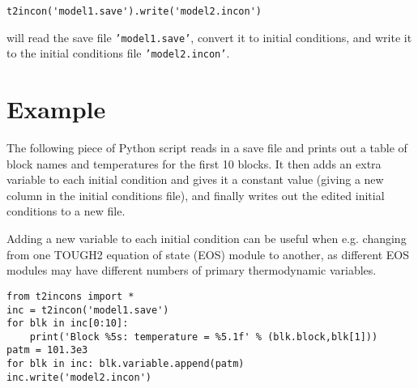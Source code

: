 \begin{lstlisting}
t2incon('model1.save').write('model2.incon')
\end{lstlisting}

will read the save file \texttt{'model1.save'}, convert it to initial conditions, and write it to the initial conditions file \texttt{'model2.incon'}.

\section{Example}

The following piece of Python script reads in a save file and prints out a table of block names and temperatures for the first 10 blocks.  It then adds an extra variable to each initial condition and gives it a constant value (giving a new column in the initial conditions file), and finally writes out the edited initial conditions to a new file.

Adding a new variable to each initial condition can be useful when e.g. changing from one TOUGH2 equation of state (EOS) module to another, as different EOS modules may have different numbers of primary thermodynamic variables.

\begin{lstlisting}
from t2incons import *
inc = t2incon('model1.save')
for blk in inc[0:10]:
    print('Block %5s: temperature = %5.1f' % (blk.block,blk[1]))
patm = 101.3e3
for blk in inc: blk.variable.append(patm)
inc.write('model2.incon')
\end{lstlisting}

